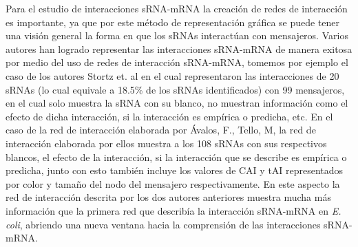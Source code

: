 Para el estudio de interacciones sRNA-mRNA la creaci\'on de redes de interacci\'on es importante, ya que por este m\'etodo de representaci\'on gr\'afica se puede tener una visi\'on general la forma en que los sRNAs interact\'uan con mensajeros. Varios autores han logrado representar las interacciones sRNA-mRNA de manera exitosa por medio del uso de redes de interacci\'on sRNA-mRNA, tomemos por ejemplo el caso de los autores Stortz et. al \cite{Storz2011} en el cual representaron las interacciones de 20 sRNAs (lo cual equivale a 18.5\% de los sRNAs identificados) con 99 mensajeros, en el cual solo muestra la sRNA con su blanco, no muestran informaci\'on como el efecto de dicha interacci\'on, si la interacci\'on es emp\'irica o predicha, etc. En el caso de la red de interacci\'on elaborada por \'Avalos, F., Tello, M, la red de interacci\'on elaborada por ellos muestra a los 108 sRNAs con sus respectivos blancos, el efecto de la interacci\'on, si la interacci\'on que se describe es emp\'irica o predicha, junto con esto tambi\'en incluye los valores de CAI y tAI representados por color y tama\~no del nodo del mensajero respectivamente. En este aspecto la red de interacci\'on descrita por los dos autores anteriores muestra mucha m\'as informaci\'on que la primera red que describ\'ia la interacci\'on sRNA-mRNA en \textit{E. coli}, abriendo una nueva ventana hacia la comprensi\'on de las interacciones sRNA-mRNA.